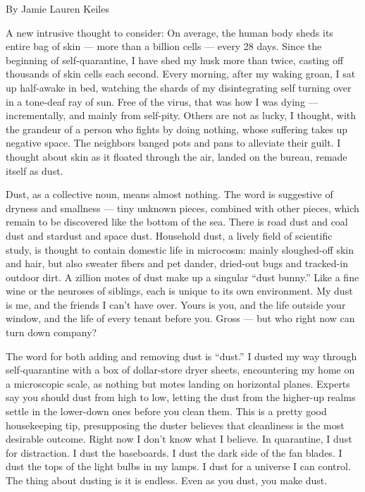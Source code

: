 By Jamie Lauren Keiles

A new intrusive thought to consider: On average, the human body sheds
its entire bag of skin --- more than a billion cells --- every 28 days.
Since the beginning of self-quarantine, I have shed my husk more than
twice, casting off thousands of skin cells each second. Every morning,
after my waking groan, I sat up half-awake in bed, watching the shards
of my disintegrating self turning over in a tone-deaf ray of sun. Free
of the virus, that was how I was dying --- incrementally, and mainly
from self-pity. Others are not as lucky, I thought, with the grandeur of
a person who fights by doing nothing, whose suffering takes up negative
space. The neighbors banged pots and pans to alleviate their guilt. I
thought about skin as it floated through the air, landed on the bureau,
remade itself as dust.

Dust, as a collective noun, means almost nothing. The word is suggestive
of dryness and smallness --- tiny unknown pieces, combined with other
pieces, which remain to be discovered like the bottom of the sea. There
is road dust and coal dust and stardust and space dust. Household dust,
a lively field of scientific study, is thought to contain domestic life
in microcosm: mainly sloughed-off skin and hair, but also sweater fibers
and pet dander, dried-out bugs and tracked-in outdoor dirt. A zillion
motes of dust make up a singular ``dust bunny.'' Like a fine wine or the
neuroses of siblings, each is unique to its own environment. My dust is
me, and the friends I can't have over. Yours is you, and the life
outside your window, and the life of every tenant before you. Gross ---
but who right now can turn down company?

The word for both adding and removing dust is ``dust.'' I dusted my way
through self-quarantine with a box of dollar-store dryer sheets,
encountering my home on a microscopic scale, as nothing but motes
landing on horizontal planes. Experts say you should dust from high to
low, letting the dust from the higher-up realms settle in the lower-down
ones before you clean them. This is a pretty good housekeeping tip,
presupposing the duster believes that cleanliness is the most desirable
outcome. Right now I don't know what I believe. In quarantine, I dust
for distraction. I dust the baseboards. I dust the dark side of the fan
blades. I dust the tops of the light bulbs in my lamps. I dust for a
universe I can control. The thing about dusting is it is endless. Even
as you dust, you make dust.

